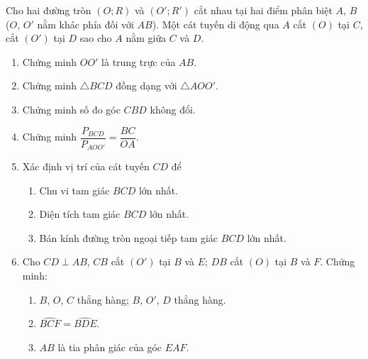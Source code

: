 \begin{bt}%
	Cho hai đường tròn $(O;R)$ và $(O';R')$ cắt nhau tại hai điểm phân biệt $A$, $B$ ($O$, $O'$ nằm khác phía đối với $AB$). Một cát tuyến di động qua $A$ cắt $(O)$ tại $C$, cắt $(O')$ tại $D$ sao cho $A$ nằm giữa $C$ và $D$.
	\begin{enumerate}
		\item Chứng minh $OO'$ là trung trực của $AB$.
		\item Chứng minh $\triangle BCD$ đồng dạng với $\triangle AOO'$.
		\item Chứng minh số đo góc $CBD$ không đổi.
		\item Chứng minh $\dfrac{P_{BCD}}{P_{AOO'}}=\dfrac{BC}{OA}$.
		\item Xác định vị trí của cát tuyến $CD$ để
		\begin{enumerate}[1)]
			\item Chu vi tam giác $BCD$ lớn nhất.
			\item Diện tích tam giác $BCD$ lớn nhất.
			\item Bán kính đường tròn ngoại tiếp tam giác $BCD$ lớn nhất.
		\end{enumerate}
		\item Cho $CD\perp AB$, $CB$ cắt $(O')$ tại $B$ và $E$; $DB$ cắt $(O)$ tại $B$ và $F$. Chứng minh:
		\begin{enumerate}[1)]
			\item $B$, $O$, $C$ thẳng hàng; $B$, $O'$, $D$ thẳng hàng.
			\item $\widehat{BCF}=\widehat{BDE}$.
			\item $AB$ là tia phân giác của góc $EAF$.
		\end{enumerate}
	\end{enumerate}
\end{bt}
